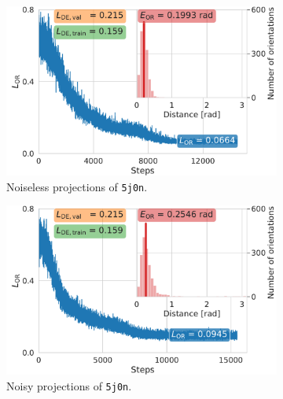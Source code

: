 \begin{figure}[t]
    \centering
    \begin{subfigure}[b]{0.32\linewidth}
        \centering
        \includegraphics[width=\linewidth]{figures/5j0n_fullcvg_uniformS2_noise0_ar_aa.pdf}
        \caption{Noiseless projections of \texttt{5j0n}.}%
        \label{fig:5j0n-noise0-orientation-recovery}
    \end{subfigure}
    \hfill
    \begin{subfigure}[b]{0.32\linewidth}
        \centering
        \includegraphics[width=\linewidth]{figures/5j0n_fullcvg_uniformS2_noise16_ar_aa.pdf}
        \caption{Noisy projections of \texttt{5j0n}.}%
        \label{fig:5j0n-noise16-orientation-recovery}
    \end{subfigure}
    \hfill
    \begin{subfigure}[b]{0.32\linewidth}

\end{subfigure}
\end{figure}
